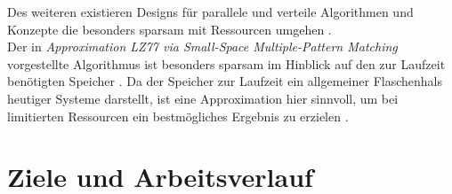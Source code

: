 	Des weiteren existieren Designs für parallele und verteile Algorithmen \cite{distribut} und Konzepte die besonders sparsam mit Ressourcen umgehen \cite{karker}.\\
	Der in {\it Approximation LZ77 via Small-Space Multiple-Pattern Matching} vorgestellte Algorithmus ist besonders sparsam im Hinblick auf den zur Laufzeit benötigten Speicher \cite{LZ77Approx}. Da der Speicher zur Laufzeit ein allgemeiner Flaschenhals heutiger Systeme darstellt, ist eine Approximation hier sinnvoll, um bei limitierten Ressourcen ein bestmögliches Ergebnis zu erzielen \cite{LZ77Approx}.
	
	\section{Ziele und Arbeitsverlauf}
	
